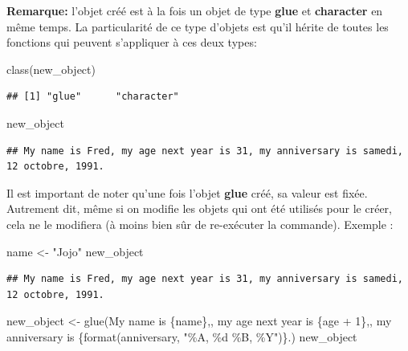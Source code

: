 \documentclass[
]{book}
\newenvironment{Shaded}{\begin{snugshade}}{\end{snugshade}}
\newcommand{\FunctionTok}[1]{\textcolor[rgb]{0.00,0.00,0.00}{#1}}
\newcommand{\NormalTok}[1]{#1}
\newcommand{\OtherTok}[1]{\textcolor[rgb]{0.56,0.35,0.01}{#1}}
\newcommand{\StringTok}[1]{\textcolor[rgb]{0.31,0.60,0.02}{#1}}
\theoremstyle{definition}
\theoremstyle{definition}
\theoremstyle{definition}
\theoremstyle{definition}
\theoremstyle{remark}
\begin{document}
\textbf{Remarque:} l'objet créé est à la fois un objet de type \textbf{glue} et \textbf{character} en même temps. La particularité de ce type d'objets est qu'il hérite de toutes les fonctions qui peuvent s'appliquer à ces deux types:

\begin{Shaded}
\begin{Highlighting}[]
\FunctionTok{class}\NormalTok{(new\_object)}
\end{Highlighting}
\end{Shaded}

\begin{verbatim}
## [1] "glue"      "character"
\end{verbatim}

\begin{Shaded}
\begin{Highlighting}[]
\NormalTok{new\_object}
\end{Highlighting}
\end{Shaded}

\begin{verbatim}
## My name is Fred, my age next year is 31, my anniversary is samedi, 12 octobre, 1991.
\end{verbatim}

Il est important de noter qu'une fois l'objet \textbf{glue} créé, sa valeur est fixée. Autrement dit, même si on modifie les objets qui ont été utilisés pour le créer, cela ne le modifiera (à moins bien sûr de re-exécuter la commande). Exemple :

\begin{Shaded}
\begin{Highlighting}[]
\NormalTok{name }\OtherTok{\textless{}{-}} \StringTok{"Jojo"}
\NormalTok{new\_object}
\end{Highlighting}
\end{Shaded}

\begin{verbatim}
## My name is Fred, my age next year is 31, my anniversary is samedi, 12 octobre, 1991.
\end{verbatim}

\begin{Shaded}
\begin{Highlighting}[]
\NormalTok{new\_object }\OtherTok{\textless{}{-}} \FunctionTok{glue}\NormalTok{(}\StringTok{\textquotesingle{}My name is \{name\},\textquotesingle{}}\NormalTok{,}
  \StringTok{\textquotesingle{} my age next year is \{age + 1\},\textquotesingle{}}\NormalTok{,}
  \StringTok{\textquotesingle{} my anniversary is \{format(anniversary, "\%A, \%d \%B, \%Y")\}.\textquotesingle{}}\NormalTok{)}
\NormalTok{new\_object}
\end{Highlighting}
\end{Shaded}
\end{document}
